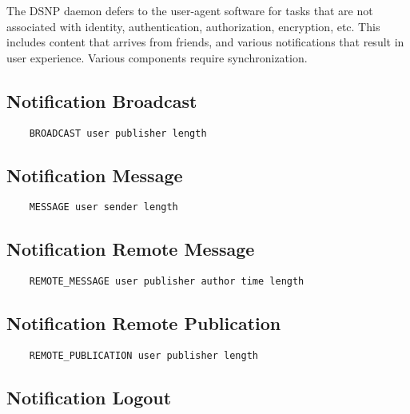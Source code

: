 \documentclass[letterpaper,11pt,oneside]{article}
\begin{document}
The DSNP daemon defers to the user-agent software for tasks that are not
associated with identity, authentication, authorization, encryption, etc. This
includes content that arrives from friends, and various notifications that
result in user experience. Various components require synchronization.

\subsection{Notification Broadcast}

\vspace{10pt}
\begin{verbatim}
    BROADCAST user publisher length 
\end{verbatim}
\vspace{10pt}

\subsection{Notification Message}

\vspace{10pt}
\begin{verbatim}
    MESSAGE user sender length 
\end{verbatim}
\vspace{10pt}

\subsection{Notification Remote Message}

\vspace{10pt}
\begin{verbatim}
    REMOTE_MESSAGE user publisher author time length 
\end{verbatim}
\vspace{10pt}

\subsection{Notification Remote Publication}

\vspace{10pt}
\begin{verbatim}
    REMOTE_PUBLICATION user publisher length 
\end{verbatim}
\vspace{10pt}

\subsection{Notification Logout}
\end{document}
